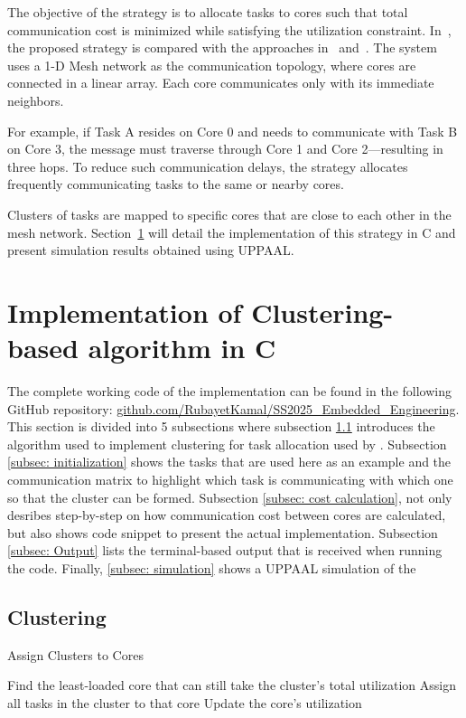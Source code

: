 \documentclass[conference]{IEEEtran}
\begin{document}
The objective of the strategy is to allocate tasks to cores such that total communication cost is minimized while satisfying the utilization constraint. In~\cite{AbdallahGB24}, the proposed strategy is compared with the approaches in~\cite{thatindianpaper} and~\cite{anotherindianpaper}. The system uses a 1-D Mesh network as the communication topology, where cores are connected in a linear array. Each core communicates only with its immediate neighbors.

For example, if Task A resides on Core 0 and needs to communicate with Task B on Core 3, the message must traverse through Core 1 and Core 2—resulting in three hops. To reduce such communication delays, the strategy allocates frequently communicating tasks to the same or nearby cores.

Clusters of tasks are mapped to specific cores that are close to each other in the mesh network. Section~\ref{sec:implementation} will detail the implementation of this strategy in C and present simulation results obtained using UPPAAL.


\section{Implementation of Clustering-based algorithm in C}
\label{sec:implementation}

The complete working code of the implementation can be found in the following GitHub repository:  
\href{https://github.com/RubayetKamal/SS2025_Embedded_Engineering/tree/main/Real%20Time%20Systems/PartitionBasedScheduling_In_MulticoreSystems}{github.com/RubayetKamal/SS2025\_Embedded\_Engineering}. This section is divided into 5 subsections where subsection \ref{subsec: clustering} introduces the algorithm used to implement clustering for task allocation used by \cite{AbdallahGB24}. Subsection \ref{subsec: initialization} shows the tasks that are used here as an example and the communication matrix to highlight which task is communicating with which one so that the cluster can be formed. Subsection \ref{subsec: cost calculation}, not only desribes step-by-step on how communication cost between cores are calculated, but also shows code snippet to present the actual implementation. Subsection \ref{subsec: Output} lists the terminal-based output that is received when running the code. Finally, \ref{subsec: simulation} shows a UPPAAL simulation of the


\subsection{Clustering}
\label{subsec: clustering}
\begin{algorithm}
\caption{Assign Clusters to Cores}
\begin{algorithmic}[1]
    \STATE Find the least-loaded core that can still take the cluster’s total utilization
    \STATE Assign all tasks in the cluster to that core
    \STATE Update the core's utilization
\ENDFOR
\end{algorithmic}
\label{alg:cluster_assignment}
\end{algorithm}
\end{document}
